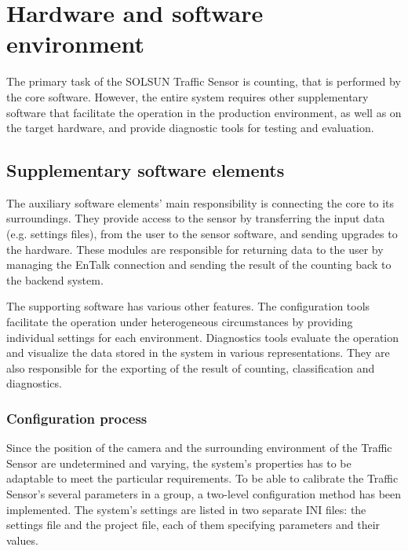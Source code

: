\chapter{Hardware and software environment}\label{chap:Environment}
The primary task of the SOLSUN Traffic Sensor is counting, that is performed by the core software.
However, the entire system requires other supplementary software that facilitate the operation in the production environment, as well as on the target hardware, and provide diagnostic tools for testing and evaluation.
\section{Supplementary software elements}\label{sec:SupplementarySoftware}
The auxiliary software elements' main responsibility is connecting the core to its surroundings.
They provide access to the sensor by transferring the input data (e.g. settings files), from the user to the sensor software, and sending upgrades to the hardware.
These modules are responsible for returning data to the user by managing the EnTalk connection and sending the result of the counting back to the backend system.

The supporting software has various other features.
The configuration tools facilitate the operation under heterogeneous circumstances by providing individual settings for each environment.
Diagnostics tools evaluate the operation and visualize the data stored in the system in various representations.
They are also responsible for the exporting of the result of counting, classification and diagnostics.
\subsection{Configuration process}\label{subs:ProjectConfigurator}
Since the position of the camera and the surrounding environment of the Traffic Sensor are undetermined and varying, the system's properties has to be adaptable to meet the particular requirements.
To be able to calibrate the Traffic Sensor's several parameters in a group, a two-level configuration method has been implemented.
The system's settings are listed in two separate INI files: the settings file and the project file, each of them specifying parameters and their values.

